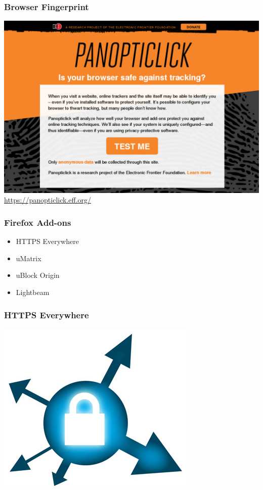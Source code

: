 \documentclass[12pt, table]{beamer}
\begin{document}
\begin{frame}
	\frametitle{Browser Fingerprint}
	\begin{center}
	    \includegraphics[height=0.7\textheight]{../img/browser_fingerprint.png}
    	\newline
    	\url{https://panopticlick.eff.org/}
    \end{center}
\end{frame}

\begin{frame}
	\frametitle{Firefox Add-ons}
    \begin{itemize}
      	\item HTTPS Everywhere
      	\item uMatrix
      	\item uBlock Origin
      	\item Lightbeam
    \end{itemize}
\end{frame}

\begin{frame}
    \frametitle{HTTPS Everywhere}
    \begin{center}
    	\includegraphics[height=0.7\textheight]{../img/https_everywhere.png}
    \end{center}
\end{frame}
\end{document}
